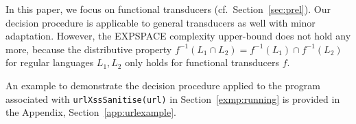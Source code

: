 \begin{remark}
	In this paper, we focus on functional transducers (cf.\ Section~\ref{sec:prel}). Our decision procedure is applicable to general transducers as well with minor adaptation. However, the EXPSPACE complexity upper-bound does not hold any more, because the distributive property $f^{-1}(L_1\cap L_2)= f^{-1}(L_1)\cap f^{-1}(L_2)$ for regular languages $L_1, L_2$ only holds for functional transducers $f$.  
\end{remark}

An example to demonstrate the decision procedure applied to the program associated with {\tt urlXssSanitise(url)} in Section~\ref{exmp:running} is provided in the Appendix, Section~\ref{app:urlexample}.

